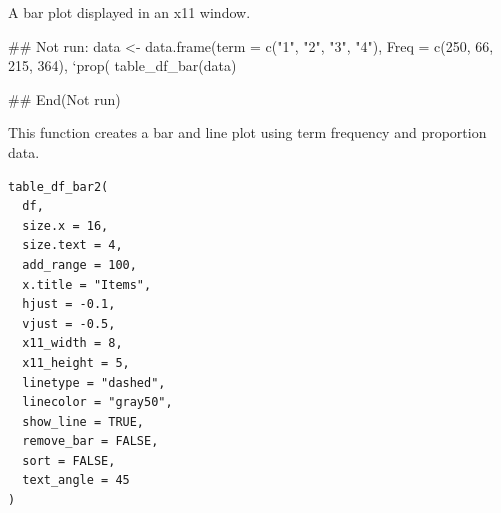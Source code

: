 \documentclass[a4paper]{book}
\begin{document}
%
\begin{Value}
A bar plot displayed in an x11 window.
\end{Value}
%
\begin{Examples}
\begin{ExampleCode}
\#\# Not run: 
data <- data.frame(term = c("1", "2", "3", "4"), Freq = c(250, 66, 215, 364),
                   `prop(%
table_df_bar(data)

## End(Not run)
\end{ExampleCode}
\end{Examples}
%
\begin{Description}
This function creates a bar and line plot using term frequency and proportion data.
\end{Description}
%
\begin{Usage}
\begin{verbatim}
table_df_bar2(
  df,
  size.x = 16,
  size.text = 4,
  add_range = 100,
  x.title = "Items",
  hjust = -0.1,
  vjust = -0.5,
  x11_width = 8,
  x11_height = 5,
  linetype = "dashed",
  linecolor = "gray50",
  show_line = TRUE,
  remove_bar = FALSE,
  sort = FALSE,
  text_angle = 45
)
\end{verbatim}
\end{Usage}
%
\end{document}

